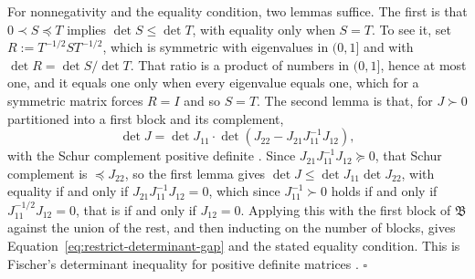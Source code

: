 For nonnegativity and the equality condition, two lemmas suffice. The first is that $0\prec S\preceq T$ implies $\det S\leq\det T$, with equality only when $S=T$. To see it, set $R:=T^{-1/2}ST^{-1/2}$, which is symmetric with eigenvalues in $(0,1]$ and with $\det R=\det S/\det T$. That ratio is a product of numbers in $(0,1]$, hence at most one, and it equals one only when every eigenvalue equals one, which for a symmetric matrix forces $R=I$ and so $S=T$. The second lemma is that, for $J\succ0$ partitioned into a first block and its complement,
\begin{equation}
\det J=\det J_{11}\cdot\det\left(J_{22}-J_{21}J_{11}^{-1}J_{12}\right),
\label{eq:restrict-schur-determinant}
\end{equation}
with the Schur complement positive definite \citep{Zhang2005Schur}. Since $J_{21}J_{11}^{-1}J_{12}\succeq0$, that Schur complement is $\preceq J_{22}$, so the first lemma gives $\det J\leq\det J_{11}\det J_{22}$, with equality if and only if $J_{21}J_{11}^{-1}J_{12}=0$, which since $J_{11}^{-1}\succ0$ holds if and only if $J_{11}^{-1/2}J_{12}=0$, that is if and only if $J_{12}=0$. Applying this with the first block of $\mathfrak B$ against the union of the rest, and then inducting on the number of blocks, gives Equation~\eqref{eq:restrict-determinant-gap} and the stated equality condition. This is Fischer's determinant inequality for positive definite matrices \citep[\S7.8]{HornJohnson2013}. $\square$

